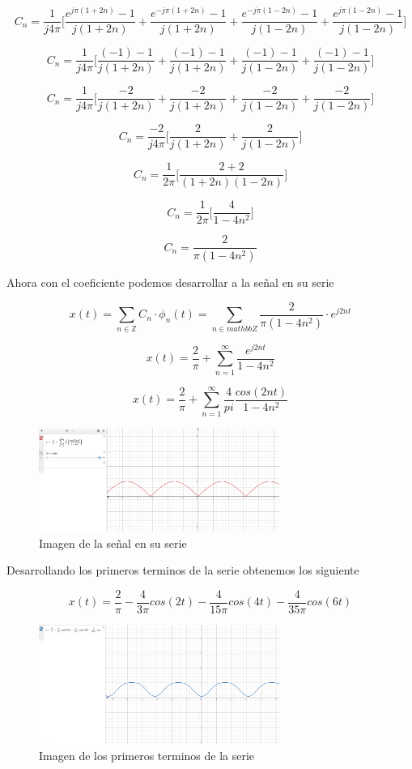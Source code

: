 $$C_n = \dfrac{1}{j4\pi} \bigg[\dfrac{e^{j\pi(1+2n)}-1}{j(1+2n)} + \dfrac{e^{-j\pi(1+2n)}-1}{j(1+2n)} + \dfrac{e^{-j\pi(1-2n)}-1}{j(1-2n)} + \dfrac{e^{j\pi(1-2n)}-1}{j(1-2n)} \bigg] $$

$$C_n = \dfrac{1}{j4\pi} \bigg[\dfrac{(-1)-1}{j(1+2n)} + \dfrac{(-1)-1}{j(1+2n)} + \dfrac{(-1)-1}{j(1-2n)} + \dfrac{(-1)-1}{j(1-2n)} \bigg] $$

$$C_n = \dfrac{1}{j4\pi} \bigg[\dfrac{-2}{j(1+2n)} + \dfrac{-2}{j(1+2n)} + \dfrac{-2}{j(1-2n)} + \dfrac{-2}{j(1-2n)} \bigg] $$

$$C_n = \dfrac{-2}{j4\pi} \bigg[\dfrac{2}{j(1+2n)} + \dfrac{2}{j(1-2n)} \bigg] $$

$$C_n = \dfrac{1}{2\pi} \bigg[\dfrac{2+2}{(1+2n)(1-2n)}\bigg] $$

$$C_n = \dfrac{1}{2\pi} \bigg[\dfrac{4}{1-4n^2} \bigg] $$

$$C_n = \dfrac{2}{\pi(1-4n^2)} $$

Ahora con el coeficiente podemos desarrollar a la se\~nal en su serie

\[x(t) = \sum_{n \in \mathbb{Z}} C_n \cdot \phi_n (t) = \sum_{n \in mathbb{Z}} \dfrac{2}{\pi(1-4n^2)} \cdot e^{j2nt}\]

\[x(t) = \dfrac{2}{\pi} + \sum_{n=1}^{\infty} \dfrac{e^{j2nt}}{1-4n^2} \]

\[x(t) = \dfrac{2}{\pi} + \sum_{n=1}^{\infty} \dfrac{4}{pi} \dfrac{cos(2nt)}{1-4n^2} \]

\begin{figure}[H]
  \centering
  \includegraphics[width=0.7\textwidth]{photos/graf_onda_completa.png}
  \caption{Imagen de la se\~nal en su serie}
\end{figure}

Desarrollando los primeros terminos de la serie obtenemos los siguiente

\[x(t) = \dfrac{2}{\pi} - \dfrac{4}{3\pi} cos(2t) - \dfrac{4}{15\pi} cos(4t) - \dfrac{4}{35\pi} cos(6t)\]

\begin{figure}[H]
  \centering
  \includegraphics[width=0.7\textwidth]{photos/graf_aprox_onda_completa.png}
  \caption{Imagen de los primeros terminos de la serie}
\end{figure}

